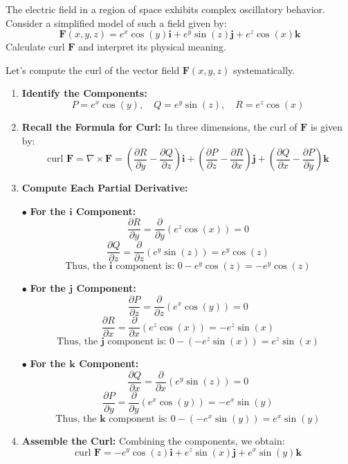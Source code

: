 \exampleline
\begin{example}
The electric field in a region of space exhibits complex oscillatory behavior. Consider a simplified model of such a field given by:
\[
\mathbf{F}(x,y,z) = e^{x} \cos(y)\mathbf{i} + e^{y} \sin(z)\mathbf{j} + e^{z} \cos(x)\mathbf{k}
\]
Calculate $\text{curl }\mathbf{F}$ and interpret its physical meaning.

\begin{solution}
Let's compute the curl of the vector field $\mathbf{F}(x,y,z)$ systematically.

\begin{enumerate}
\item \textbf{Identify the Components:}
\[
P = e^{x} \cos(y), \quad Q = e^{y} \sin(z), \quad R = e^{z} \cos(x)
\]

\item \textbf{Recall the Formula for Curl:}
In three dimensions, the curl of $\mathbf{F}$ is given by:
\[
\text{curl }\mathbf{F} = \nabla \times \mathbf{F} = \left(\frac{\partial R}{\partial y} - \frac{\partial Q}{\partial z}\right)\mathbf{i} + 
\left(\frac{\partial P}{\partial z} - \frac{\partial R}{\partial x}\right)\mathbf{j} + 
\left(\frac{\partial Q}{\partial x} - \frac{\partial P}{\partial y}\right)\mathbf{k}
\]

\item \textbf{Compute Each Partial Derivative:}

$\bullet$ \textbf{For the $\mathbf{i}$ Component:}
\[
\frac{\partial R}{\partial y} = \frac{\partial}{\partial y} \left( e^{z} \cos(x) \right) = 0
\]
\[
\frac{\partial Q}{\partial z} = \frac{\partial}{\partial z} \left( e^{y} \sin(z) \right) = e^{y} \cos(z)
\]
\[
\text{Thus, the } \mathbf{i} \text{ component is: } 0 - e^{y} \cos(z) = -e^{y} \cos(z)
\]

$\bullet$ \textbf{For the $\mathbf{j}$ Component:}
\[
\frac{\partial P}{\partial z} = \frac{\partial}{\partial z} \left( e^{x} \cos(y) \right) = 0
\]
\[
\frac{\partial R}{\partial x} = \frac{\partial}{\partial x} \left( e^{z} \cos(x) \right) = -e^{z} \sin(x)
\]
\[
\text{Thus, the } \mathbf{j} \text{ component is: } 0 - (-e^{z} \sin(x)) = e^{z} \sin(x)
\]

$\bullet$ \textbf{For the $\mathbf{k}$ Component:}
\[
\frac{\partial Q}{\partial x} = \frac{\partial}{\partial x} \left( e^{y} \sin(z) \right) = 0
\]
\[
\frac{\partial P}{\partial y} = \frac{\partial}{\partial y} \left( e^{x} \cos(y) \right) = -e^{x} \sin(y)
\]
\[
\text{Thus, the } \mathbf{k} \text{ component is: } 0 - (-e^{x} \sin(y)) = e^{x} \sin(y)
\]


\item \textbf{Assemble the Curl:}
Combining the components, we obtain:
\[
\text{curl }\mathbf{F} = -e^{y} \cos(z)\mathbf{i} + e^{z} \sin(x)\mathbf{j} + e^{x} \sin(y)\mathbf{k}
\]
\end{enumerate}

\end{solution}
\end{example}
